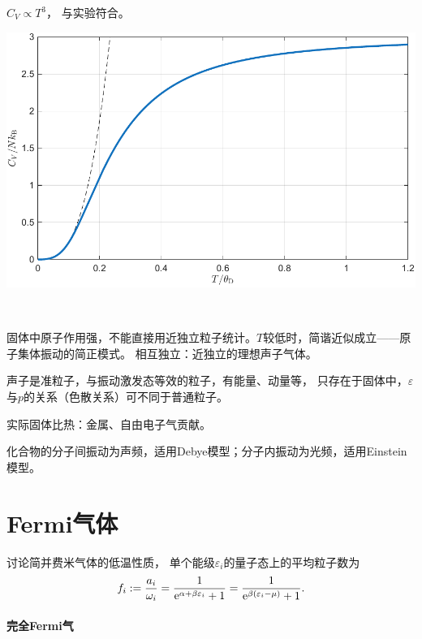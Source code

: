 $C_V\propto T^3$，
与实验符合。
\begin{center}
	\includegraphics[width=0.8\linewidth]{figures/C_Vphonon.pdf}
	\label{fig:CV phonon}
\end{center}

\begin{remark}
	~
\begin{compactenum}
	\item 固体中原子作用强，不能直接用近独立粒子统计。$T$较低时，简谐近似成立——原子集体振动的简正模式。
	相互独立：近独立的理想声子气体。
	\item 声子是准粒子，与振动激发态等效的粒子，有能量、动量等，
	只存在于固体中，$\varepsilon$与$p$的关系（色散关系）可不同于普通粒子。
	\item 实际固体比热：金属、自由电子气贡献。

	化合物的分子间振动为声频，适用Debye模型；分子内振动为光频，适用Einstein模型。
\end{compactenum}
\end{remark}

\section{Fermi气体}

讨论简并费米气体的低温性质，
单个能级$\varepsilon_i$的量子态上的平均粒子数为
\[
	f_i:=\frac{a_i}{\omega_i}=\frac1{\mathop{}\!\mathrm{e}^{\alpha+\beta\varepsilon_i}+1}=\frac1{\mathop{}\!\mathrm{e}^{\beta(\varepsilon_i-\mu)}+1}.
\]

\paragraph{完全Fermi气}

